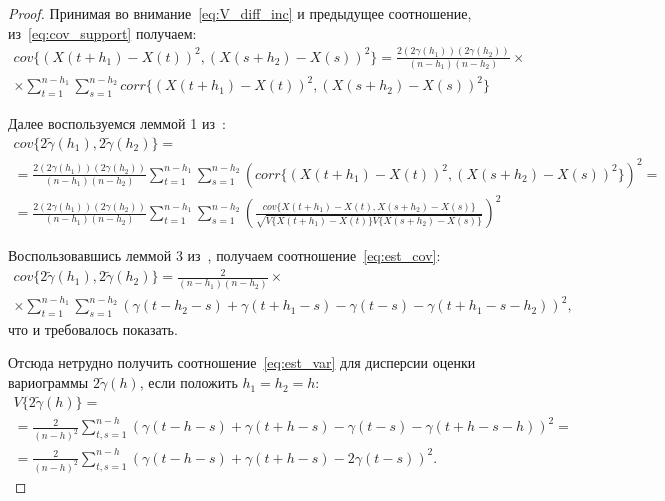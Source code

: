\begin{proof}
Принимая во внимание~\eqref{eq:V_diff_inc} и предыдущее соотношение, из~\eqref{eq:cov_support} получаем:
\begin{equation*}\begin{gathered}
	cov\{ (X(t + h_1) - X(t))^2, (X(s + h_2) - X(s))^2 \} = \frac{2 (2\gamma(h_1))(2\gamma(h_2))}{(n - h_1)(n - h_2)} \times \\
	\times \sum_{t = 1}^{n - h_1}\sum_{s = 1}^{n - h_2} corr\{(X(t + h_1) - X(t))^2, (X(s + h_2) - X(s))^2 \}
\end{gathered}\end{equation*}

Далее воспользуемся леммой 1 из~\cite{tsekhavaya-brest}:
\begin{equation*}\begin{gathered}
	cov\{ 2 \tilde{\gamma}(h_1), 2 \tilde{\gamma}(h_2) \} = \\
	= \frac{2 (2\gamma(h_1))(2\gamma(h_2))}{(n - h_1)(n - h_2)} \sum_{t = 1}^{n - h_1}\sum_{s = 1}^{n - h_2} (corr\{(X(t + h_1) - X(t))^2, (X(s + h_2) - X(s))^2 \})^2 = \\
	= \frac{2 (2\gamma(h_1))(2\gamma(h_2))}{(n - h_1)(n - h_2)}\sum_{t = 1}^{n - h_1}\sum_{s = 1}^{n - h_2} ( \frac{cov\{ X(t + h_1) - X(t), X(s + h_2) - X(s) \}}{\sqrt{V\{ X( t + h_1) - X(t) \} V\{ X(s + h_2) - X(s) \}}} )^2
\end{gathered}\end{equation*}

Воспользовавшись леммой 3 из~\cite{tsekhavaya-brest}, получаем соотношение~\eqref{eq:est_cov}:
\begin{gather*}
	cov\{ 2 \tilde{\gamma}(h_1), 2 \tilde{\gamma}(h_2) \} = \frac{2}{(n - h_1)(n - h_2)} \times \\
	\times \sum_{t = 1}^{n - h_1}\sum_{s = 1}^{n - h_2} (\gamma(t - h_2 - s) + \gamma(t + h_1 - s) - \gamma(t - s) - \gamma(t + h_1 - s - h_2))^2,
\end{gather*}
что и требовалось показать.

Отсюда нетрудно получить соотношение~\eqref{eq:est_var} для дисперсии оценки вариограммы $ 2 \tilde{\gamma}(h) $, если положить $ h_1 = h_2 = h $:
\begin{equation*}\begin{gathered}
	V \{ 2 \tilde{\gamma}(h) \} = \\
	= \frac{2}{(n - h)^2}\sum_{t,s = 1}^{n - h} ( \gamma(t - h - s) + \gamma(t + h - s) - \gamma(t - s) - \gamma(t + h - s - h) )^2 = \\
	= \frac{2}{(n-h)^2}\sum_{t,s = 1}^{n - h} ( \gamma(t - h - s) + \gamma(t + h - s) - 2\gamma(t - s) )^2.
\end{gathered}\end{equation*}

\end{proof}

